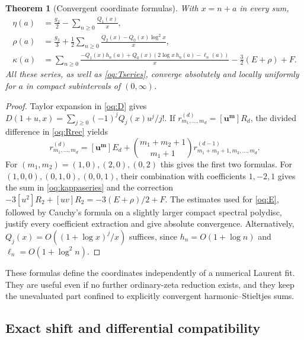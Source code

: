 \documentclass[11pt,a4paper]{article}
\numberwithin{equation}{section}
\newtheorem{theorem}{Theorem}[section]
\theoremstyle{definition}
\theoremstyle{remark}
\begin{document}
\begin{theorem}[Convergent coordinate formulas]\label{oq:series}
With $x=n+a$ in every sum,
\begin{align}
 \eta(a)&=\frac{g_2}{2}-\sum_{n\ge0}\frac{Q_1(x)}x,
 \label{oq:etaseries}\\
 \rho(a)&=\frac{g_3}{3}+
 \frac12\sum_{n\ge0}\frac{Q_2(x)-Q_0(x)\log^2x}{x},
 \label{oq:rhoseries}\\
 \kappa(a)&=\sum_{n\ge0}
 \frac{-Q_1(x)h_n(a)+Q_0(x)(2\log x\,h_n(a)-\ell_n(a))}{x}
 -\frac32(E+\rho)+F.\label{oq:kappaseries}
\end{align}
All these series, as well as \eqref{oq:Tseries}, converge absolutely
and locally uniformly for $a$ in compact subintervals of $(0,\infty)$.
\end{theorem}
\begin{proof}
Taylor expansion in \eqref{oq:D} gives
$D(1+u,x)=\sum_{j\ge0}(-1)^jQ_j(x)u^j/j!$.
If $r^{(d)}_{m_1,\ldots,m_d}=[\mathbf u^{\mathbf m}]R_d$, the
divided difference in \eqref{oq:Rrec} yields
\begin{equation}\label{oq:coeffrec}
 r^{(d)}_{m_1,\ldots,m_d}
 =[\mathbf u^{\mathbf m}]E_d+
 \binom{m_1+m_2+1}{m_1+1}
 r^{(d-1)}_{m_1+m_2+1,m_3,\ldots,m_d}.
\end{equation}
For $(m_1,m_2)=(1,0),(2,0),(0,2)$ this gives the first two formulas.
For $(1,0,0),(0,1,0),(0,0,1)$, their combination with coefficients
$1,-2,1$ gives the sum in \eqref{oq:kappaseries} and the correction
$-3[u^2]R_2+[uv]R_2=-3(E+\rho)/2+F$.
The estimates used for \eqref{oq:E}, followed by Cauchy's formula on
a slightly larger compact spectral polydisc, justify every coefficient
extraction and give absolute convergence. Alternatively,
$Q_j(x)=O((1+\log x)^j/x)$ suffices, since
$h_n=O(1+\log n)$ and $\ell_n=O(1+\log^2n)$.
\end{proof}

These formulas define the coordinates independently of a numerical
Laurent fit. They are useful even if no further ordinary-zeta reduction
exists, and they keep the unevaluated part confined to explicitly
convergent harmonic--Stieltjes sums.

\subsection{Exact shift and differential compatibility}
\end{document}
